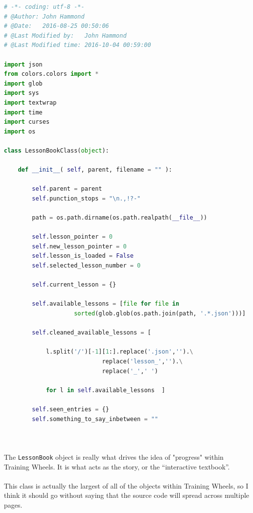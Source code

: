 \documentclass[11pt]{article}
\begin{document}
	\begin{lstlisting}[language=Python]
# -*- coding: utf-8 -*-
# @Author: John Hammond
# @Date:   2016-08-25 00:50:06
# @Last Modified by:   John Hammond
# @Last Modified time: 2016-10-04 00:59:00

import json
from colors.colors import *
import glob
import sys
import textwrap
import time
import curses
import os

class LessonBookClass(object):

	def __init__( self, parent, filename = "" ):

		self.parent = parent
		self.punction_stops = "\n.,!?-"

		path = os.path.dirname(os.path.realpath(__file__))

		self.lesson_pointer = 0
		self.new_lesson_pointer = 0
		self.lesson_is_loaded = False
		self.selected_lesson_number = 0

		self.current_lesson = {}

		self.available_lessons = [file for file in 
					sorted(glob.glob(os.path.join(path, '.*.json')))]

		self.cleaned_available_lessons = [ 	

			l.split('/')[-1][1:].replace('.json','').\
							replace('lesson_','').\
							replace('_',' ')

			for l in self.available_lessons  ]

		self.seen_entries = {}
		self.something_to_say_inbetween = ""

		
\end{lstlisting}

	\paragraph{}

	\hrulefill

	\paragraph{} The \texttt{LessonBook} object is really what drives the idea of "progress" within Training Wheels. It is what acts as the story, or the ``interactive textbook''.

	\paragraph{} This class is actually the largest of all of the objects within Training Wheels, so I think it should go without saying that the source code will spread across multiple pages. 
\end{document}
